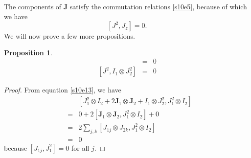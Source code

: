 \documentclass{article}
\numberwithin{equation}{section}
\let\vec\bm
\theoremstyle{plain}
\numberwithin{thm}{section}
\theoremstyle{plain}
\newtheorem{prop}{Proposition}
\numberwithin{prop}{section}
\theoremstyle{definition}
\numberwithin{defn}{section}
\theoremstyle{remark}
\begin{document}
The components of $\vec{J}$ satisfy the commutation relations \eqref{s10e5},
because of which we have
\begin{equation}\label{s10e14}
[J^2, J_z] = 0.
\end{equation}
We will now prove a few more propositions.
\begin{prop}\label{s10p2}
\begin{eqnarray}
[J^2, J_1^2 \otimes I_2] &=& 0 \label{s10e15} \\
{}[J^2, I_1 \otimes J_2^2] &=& 0 \label{s10e16}
\end{eqnarray}
\end{prop}
\begin{proof}
From equation \eqref{s10e13}, we have
\begin{eqnarray*}
[J^2, J_1^2 \otimes I_2] &=&
[J_1^2 \otimes I_2 + 2\vec{J}_1 \otimes \vec{J}_2 + I_1 \otimes J_2^2, 
J_1^2 \otimes I_2] \\
&=& 0 + 2[\vec{J}_1 \otimes \vec{J}_2, J_1^2 \otimes I_2] + 0 \\
&=& 2\sum_{j,k}[J_{1j} \otimes J_{2k}, J_1^2 \otimes I_2] \\
&=& 0
\end{eqnarray*}
because $[J_{1j}, J_1^2] = 0$ for all $j$.
\end{proof}
\end{document}
